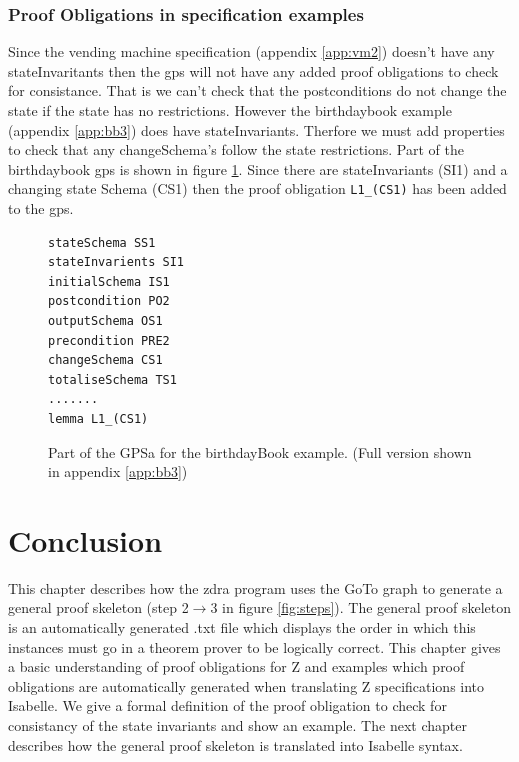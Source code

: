 \subsubsection{Proof Obligations in specification examples}
Since the vending machine specification (appendix \ref{app:vm2}) doesn't have any stateInvaritants then the \gls{gps} will not have any added proof obligations to check for consistance. That is we can't check that the postconditions do not change the state if the state has no restrictions. However the birthdaybook example (appendix \ref{app:bb3}) does have stateInvariants. Therfore we must add properties to check that any changeSchema's follow the state restrictions. Part of the birthdaybook \gls{gps} is shown in figure \ref{fig:bbgps}. Since there are stateInvariants (SI1) and a changing state Schema (CS1) then the proof obligation \texttt{L1\_(CS1)} has been added to the \gls{gps}.

\begin{figure}[H]
\begin{verbatim}
stateSchema SS1 
stateInvarients SI1 
initialSchema IS1 
postcondition PO2 
outputSchema OS1 
precondition PRE2 
changeSchema CS1 
totaliseSchema TS1 
.......
lemma L1_(CS1) 
\end{verbatim}
\caption{Part of the GPSa for the birthdayBook example. (Full version shown in appendix \ref{app:bb3}) \label{fig:bbgps}}
\end{figure}

\section{Conclusion}
\label{sec:skeletonsConclusion}

This chapter describes how the \gls{zdra} program uses the GoTo graph to generate a general proof skeleton (step 2$\rightarrow$3 in figure \ref{fig:steps}). The general proof skeleton is an automatically generated .txt file which displays the order in which this instances must go in a theorem prover to be logically correct. This chapter gives a basic understanding of proof obligations for Z and examples which proof obligations are automatically generated when translating Z specifications into Isabelle. We give a formal definition of the proof obligation to check for consistancy of the state invariants and show an example. The next chapter describes how the general proof skeleton is translated into Isabelle syntax.